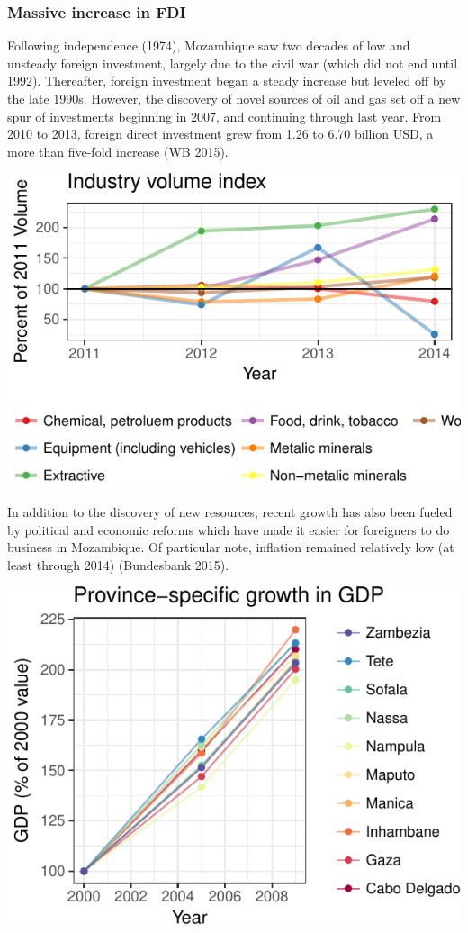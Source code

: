\documentclass[]{elsarticle} %
\begin{document}
\subsubsection{Massive increase in FDI}\label{massive-increase-in-fdi}

Following independence (1974), Mozambique saw two decades of low and
unsteady foreign investment, largely due to the civil war (which did not
end until 1992). Thereafter, foreign investment began a steady increase
but leveled off by the late 1990s. However, the discovery of novel
sources of oil and gas set off a new spur of investments beginning in
2007, and continuing through last year. From 2010 to 2013, foreign
direct investment grew from 1.26 to 6.70 billion USD, a more than
five-fold increase (WB 2015).

\begin{center}\includegraphics{paper_files/figure-latex/unnamed-chunk-8-1} \end{center}

In addition to the discovery of new resources, recent growth has also
been fueled by political and economic reforms which have made it easier
for foreigners to do business in Mozambique. Of particular note,
inflation remained relatively low (at least through 2014) (Bundesbank
2015).

\begin{center}\includegraphics{paper_files/figure-latex/unnamed-chunk-9-1} \end{center}
\end{document}
